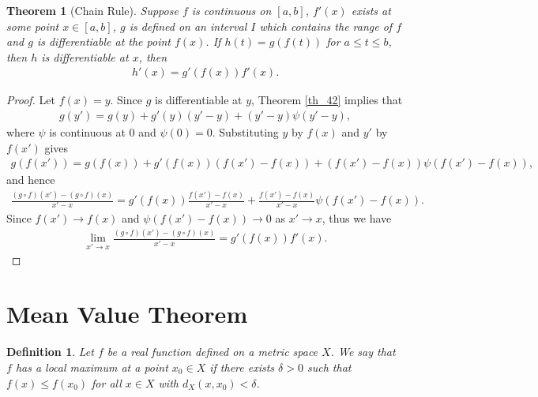 \documentclass[10pt]{book}
\newtheorem{definition}{Definition}[chapter]
\newtheorem{theorem}{Theorem}[chapter]
\theoremstyle{definition}
\numberwithin{equation}{chapter}
\begin{document}
\begin{theorem}[Chain Rule]
Suppose $f$ is continuous on $[a,b]$, $f'(x)$ exists at some point $x \in [a,b]$, $g$ is defined on an interval $I$ which contains the range of $f$ and $g$ is differentiable at the point $f(x)$. If $h(t) = g(f(t))$ for $a \leq t \leq b$, then $h$ is differentiable at $x$, then
\begin{align*}
    h'(x) = g'(f(x)) f'(x).
\end{align*}
\end{theorem}
\begin{proof}
Let $f(x) = y$. Since $g$ is differentiable at $y$, Theorem \ref{th_42} implies that 
\begin{align*}
    g(y') = g(y) + g'(y)(y' - y) + (y' - y) \psi(y' - y),
\end{align*}
where $\psi$ is continuous at $0$ and $\psi(0) = 0$. Substituting $y$ by $f(x)$ and $y'$ by $f(x')$ gives
\begin{align*}
    g(f(x')) = g(f(x)) + g'(f(x))(f(x') - f(x)) + (f(x') - f(x)) \psi(f(x') - f(x)),
\end{align*}
and hence
\begin{align*}
    \frac{(g \circ f)(x') - (g \circ f)(x)}{x' - x} = g'(f(x))\frac{f(x') - f(x)}{x' - x} + \frac{f(x') - f(x)}{x' - x} \psi(f(x') - f(x)).
\end{align*}
Since $f(x') \to f(x)$ and $\psi(f(x') - f(x)) \to 0$ as $x' \to x$, thus we have
\begin{align*}
    \lim_{x' \to x} \frac{(g \circ f)(x') - (g \circ f)(x)}{x' - x}  = g'(f(x)) f'(x).
\end{align*}
\end{proof}

\medskip





\section{Mean Value Theorem}

\begin{definition}
Let $f$ be a real function defined on a metric space $X$. We say that $f$ has a local maximum at a point $x_0 \in X$ if there exists $\delta > 0$ such that $f(x) \leq f(x_0)$ for all $x \in X$ with $d_X(x,x_0) < \delta$.
\end{definition}

\medskip
\end{document}
